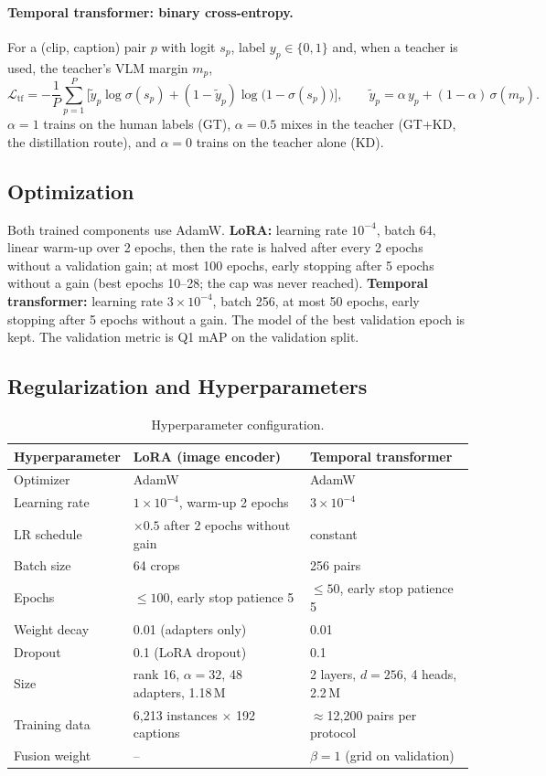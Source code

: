 \documentclass[11pt,a4paper]{article}
\begin{document}
\paragraph{Temporal transformer: binary cross-entropy.} For a (clip, caption) pair $p$ with logit $s_p$, label
$y_p\in\{0,1\}$ and, when a teacher is used, the teacher's VLM margin $m_p$,
\begin{equation}
\mathcal{L}_{\mathrm{tf}} = -\frac{1}{P}\sum_{p=1}^{P}\Big[\tilde y_p \log\sigma(s_p) + (1-\tilde y_p)\log\big(1-\sigma(s_p)\big)\Big],
\qquad \tilde y_p = \alpha\, y_p + (1-\alpha)\,\sigma(m_p) .
\end{equation}
$\alpha=1$ trains on the human labels (GT), $\alpha=0.5$ mixes in the teacher (GT+KD, the distillation route), and
$\alpha=0$ trains on the teacher alone (KD).

\subsection{Optimization}
Both trained components use AdamW. \textbf{LoRA:} learning rate $10^{-4}$, batch 64, linear warm-up over 2 epochs,
then the rate is halved after every 2 epochs without a validation gain; at most 100 epochs, early stopping after 5
epochs without a gain (best epochs 10--28; the cap was never reached). \textbf{Temporal transformer:} learning rate
$3\times10^{-4}$, batch 256, at most 50 epochs, early stopping after 5 epochs without a gain. The model of the
best validation epoch is kept. The validation metric is Q1 mAP on the validation split.

\subsection{Regularization and Hyperparameters}
\begin{table}[H]
\centering
\caption{Hyperparameter configuration.}\label{tab:hyper}
\small
\begin{tabular}{lll}
\toprule
\textbf{Hyperparameter} & \textbf{LoRA (image encoder)} & \textbf{Temporal transformer} \\
\midrule
Optimizer & AdamW & AdamW \\
Learning rate & $1\times10^{-4}$, warm-up 2 epochs & $3\times10^{-4}$ \\
LR schedule & $\times0.5$ after 2 epochs without gain & constant \\
Batch size & 64 crops & 256 pairs \\
Epochs & $\le100$, early stop patience 5 & $\le50$, early stop patience 5 \\
Weight decay & 0.01 (adapters only) & 0.01 \\
Dropout & 0.1 (LoRA dropout) & 0.1 \\
Size & rank 16, $\alpha=32$, 48 adapters, 1.18\,M & 2 layers, $d=256$, 4 heads, 2.2\,M \\
Training data & 6,213 instances $\times$ 192 captions & $\approx$12,200 pairs per protocol \\
Fusion weight & -- & $\beta=1$ (grid on validation) \\
\bottomrule
\end{tabular}
\end{table}
\end{document}
